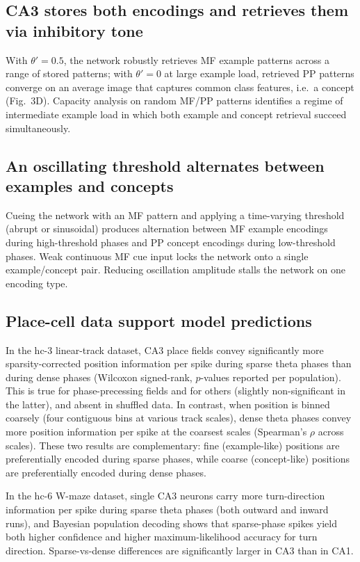 \documentclass[11pt]{article}
\begin{document}
\subsection{CA3 stores both encodings and retrieves them via inhibitory tone}
With $\theta' = 0.5$, the network robustly retrieves MF example patterns across a range of stored patterns; with $\theta' = 0$ at large example load, retrieved PP patterns converge on an average image that captures common class features, i.e.\ a concept (Fig.~3D). Capacity analysis on random MF/PP patterns identifies a regime of intermediate example load in which both example and concept retrieval succeed simultaneously.

\subsection{An oscillating threshold alternates between examples and concepts}
Cueing the network with an MF pattern and applying a time-varying threshold (abrupt or sinusoidal) produces alternation between MF example encodings during high-threshold phases and PP concept encodings during low-threshold phases. Weak continuous MF cue input locks the network onto a single example/concept pair. Reducing oscillation amplitude stalls the network on one encoding type.

\subsection{Place-cell data support model predictions}
In the hc-3 linear-track dataset, CA3 place fields convey significantly more sparsity-corrected position information per spike during sparse theta phases than during dense phases (Wilcoxon signed-rank, $p$-values reported per population). This is true for phase-precessing fields and for others (slightly non-significant in the latter), and absent in shuffled data. In contrast, when position is binned coarsely (four contiguous bins at various track scales), dense theta phases convey more position information per spike at the coarsest scales (Spearman's $\rho$ across scales). These two results are complementary: fine (example-like) positions are preferentially encoded during sparse phases, while coarse (concept-like) positions are preferentially encoded during dense phases.

In the hc-6 W-maze dataset, single CA3 neurons carry more turn-direction information per spike during sparse theta phases (both outward and inward runs), and Bayesian population decoding shows that sparse-phase spikes yield both higher confidence and higher maximum-likelihood accuracy for turn direction. Sparse-vs-dense differences are significantly larger in CA3 than in CA1.
\end{document}
